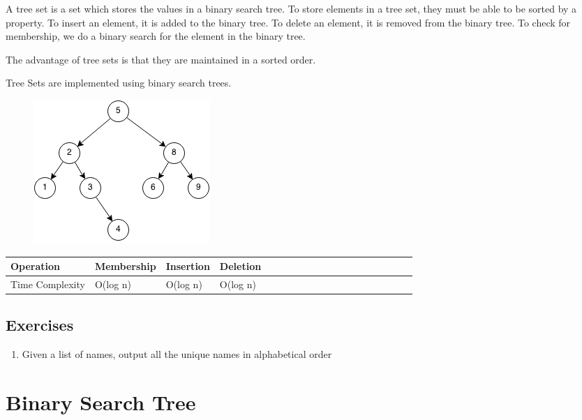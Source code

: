 \documentclass[11pt,oneside]{book}
\makeatletter
\def\maxwidth#1{\ifdim\Gin@nat@width>#1 #1\else\Gin@nat@width\fi}
\makeatother
\begin{document}
A tree set is a set which stores the values in a binary search tree. To store elements in a tree set, they must be able to be sorted by a property. To insert an element, it is added to the binary tree. To delete an element, it is removed from the binary tree. To check for membership, we do a binary search for the element in the binary tree.

The advantage of tree sets is that they are maintained in a sorted order.

Tree Sets are implemented using binary search trees.

\vspace{5px}\begin{figure}[H]\centering
        \includegraphics[width=0.66\maxwidth{\textwidth}]{bst.png}
        \end{figure}

\begin{center}\begin{tabulary}{0.4\linewidth}{|l|l|l|l|l|l|l|l|l|l|l|l|l|l|l|l|l|l|l}\hline


  Operation &
  Membership &
  Insertion &
  Deletion\\
\hline


  Time Complexity &
  O(log n) &
  O(log n) &
  O(log n)\\

\hline\end{tabulary}\end{center}

\subsection{Exercises}

\begin{enumerate}
\item Given a list of names, output all the unique names in alphabetical order
\end{enumerate}

        \section{ Binary Search Tree }
        
\end{document}
